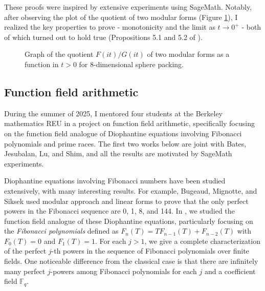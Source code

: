\documentclass[letterpaper, 10pt]{article}
\begin{document}
These proofs were inspired by extensive experiments using SageMath. 
Notably, after observing the plot of the quotient of two modular forms (Figure \ref{fig:d8graph}), I realized the key properties to prove - monotonicity and the limit as $t \to 0^+$ - both of which turned out to hold true (Propositions 5.1 and 5.2 of \cite{lee2024algebraic}).

\begin{figure}[h]
    \centering
    
    \caption{Graph of the quotient $F(it)/G(it)$ of two modular forms as a function in $t > 0$ for 8-dimensional sphere packing.}
    \label{fig:d8graph}
\end{figure}


\subsection{Function field arithmetic}

During the summer of 2025, I mentored four students at the Berkeley mathematics REU in a project on function field arithmetic, specifically focusing on the function field analogue of Diophantine equations involving Fibonacci polynomials and prime races.
The first two works below are joint with Bates, Jesubalan, Lu, and Shim, and all the results are motivated by SageMath experiments.

Diophantine equations involving Fibonacci numbers have been studied extensively, with many interesting results.
For example, Bugeaud, Mignotte, and Siksek \cite{bugeaud2006classical} used modular approach and linear forms to prove that the only perfect powers in the Fibonacci sequence are 0, 1, 8, and 144.
In \cite{bjlls2025fibonacci}, we studied the function field analogue of these Diophantine equations, particularly focusing on the \emph{Fibonacci polynomials} defined as \(F_n(T) = T F_{n-1}(T) + F_{n-2}(T)\) with \(F_0(T) = 0\) and \(F_1(T) = 1\).
For each \(j > 1\), we give a complete characterization of the perfect \(j\)-th powers in the sequence of Fibonacci polynomials over finite fields.
One noticeable difference from the classical case is that there are infinitely many perfect \(j\)-powers among Fibonacci polynomials for each \(j\) and a coefficient field \(\mathbb{F}_q\).
\end{document}
